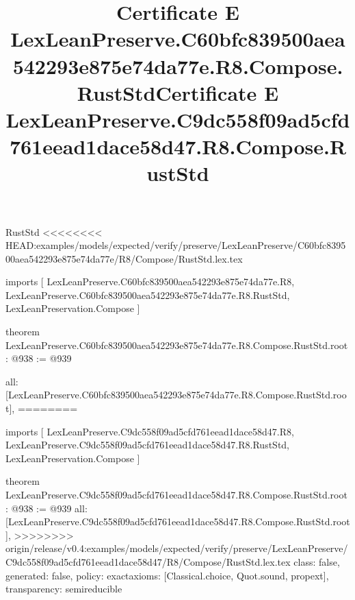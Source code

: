 \begin{lexlean}{RustStd}
<<<<<<<< HEAD:examples/models/expected/verify/preserve/LexLeanPreserve/C60bfc839500aea542293e875e74da77e/R8/Compose/RustStd.lex.tex
\title{Certificate E LexLeanPreserve.C60bfc839500aea542293e875e74da77e.R8.Compose.RustStd}
\begin{coremodule}
imports [
  LexLeanPreserve.C60bfc839500aea542293e875e74da77e.R8,
  LexLeanPreserve.C60bfc839500aea542293e875e74da77e.R8.RustStd,
  LexLeanPreservation.Compose
]

theorem LexLeanPreserve.C60bfc839500aea542293e875e74da77e.R8.Compose.RustStd.root : @938 := @939 {
  all: [LexLeanPreserve.C60bfc839500aea542293e875e74da77e.R8.Compose.RustStd.root],
========
\title{Certificate E LexLeanPreserve.C9dc558f09ad5cfd761eead1dace58d47.R8.Compose.RustStd}
\begin{coremodule}
imports [
  LexLeanPreserve.C9dc558f09ad5cfd761eead1dace58d47.R8,
  LexLeanPreserve.C9dc558f09ad5cfd761eead1dace58d47.R8.RustStd,
  LexLeanPreservation.Compose
]

theorem LexLeanPreserve.C9dc558f09ad5cfd761eead1dace58d47.R8.Compose.RustStd.root : @938 := @939 {
  all: [LexLeanPreserve.C9dc558f09ad5cfd761eead1dace58d47.R8.Compose.RustStd.root],
>>>>>>>> origin/release/v0.4:examples/models/expected/verify/preserve/LexLeanPreserve/C9dc558f09ad5cfd761eead1dace58d47/R8/Compose/RustStd.lex.tex
  class: false,
  generated: false,
  policy: exact{axioms: [Classical.choice, Quot.sound, propext]},
  transparency: semireducible
}


\end{coremodule}}
\end{coremodule}
\end{lexlean}
